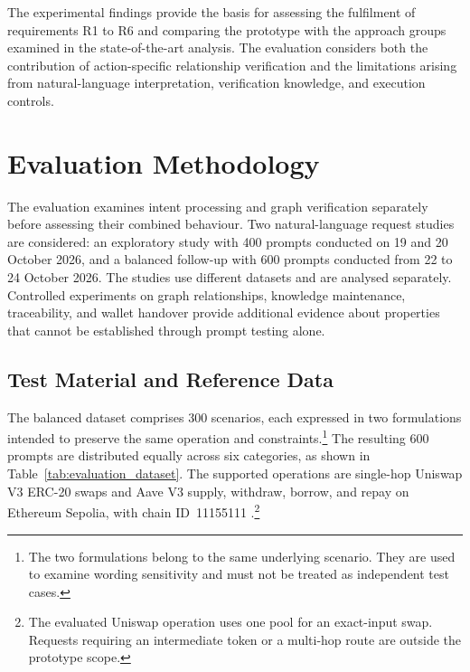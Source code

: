 The experimental findings provide the basis for assessing the
fulfilment of requirements R1 to R6 and comparing the prototype
with the approach groups examined in the state-of-the-art analysis.
The evaluation considers both the contribution of action-specific
relationship verification and the limitations arising from
natural-language interpretation, verification knowledge, and
execution controls.



\section{Evaluation Methodology}
\label{sec:evaluation_methodology}

The evaluation examines intent processing and graph verification separately
before assessing their combined behaviour. Two natural-language request studies
are considered: an exploratory study with 400 prompts conducted on 19 and
20 October 2026, and a balanced follow-up with 600 prompts conducted from
22 to 24 October 2026. The studies use different datasets and are analysed
separately. Controlled experiments on graph relationships, knowledge
maintenance, traceability, and wallet handover provide additional evidence
about properties that cannot be established through prompt testing alone.

\subsection{Test Material and Reference Data}
\label{sec:evaluation_test_material}

The balanced dataset comprises 300 scenarios, each expressed in two formulations
intended to preserve the same operation and constraints.\footnote{The two
formulations belong to the same underlying scenario. They are used to examine
wording sensitivity and must not be treated as independent test cases.}
The resulting 600 prompts are distributed equally across six categories, as
shown in Table~\ref{tab:evaluation_dataset}. The supported operations are
single-hop Uniswap V3 ERC-20 swaps and Aave V3 supply, withdraw, borrow, and
repay on Ethereum Sepolia, with chain ID~11155111
\cite{implUniswapSingleSwap,implAavePool}.\footnote{The evaluated Uniswap
operation uses one pool for an exact-input swap. Requests requiring an
intermediate token or a multi-hop route are outside the prototype scope.}


